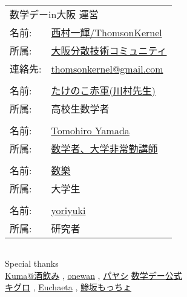 \documentclass[b5paper,fleqn]{ltjsarticle}
\begin{document}
\newpage
\thispagestyle{empty}
\vspace*{\fill}
\begin{flushright}
\begin{minipage}{0.5\hsize}
  \begin{tabular}{|ll}
  \multicolumn{2}{|l}{数学デーin大阪 運営}\\[10pt]
  名前: &\href{https://twitter.com/ThomsonKernel}{西村一輝/ThomsonKernel}\\
  所属: &\href{https://sites.google.com/view/osaka-dtc}{大阪分散技術コミュニティ}\\
  連絡先: & \href{mailto:thomsonkernel@gmail.com}{thomsonkernel@gmail.com}\\
  \\
  名前: &\href{https://twitter.com/691_7758337633}{たけのこ赤軍(川村先生)}\\
  所属: &高校生数学者\\
  \\
  名前: &\href{https://twitter.com/tyamada1093}{Tomohiro Yamada}\\
  所属: &\href{https://kansai-lisp-useres.connpass.com}{数学者、大学非常勤講師}\\
  \\
  名前: &\href{https://twitter.com/coc_mathfun}{数樂}\\
  所属: &大学生\\
  \\
  名前: &\href{https://twitter.com/yoriyuki}{yoriyuki}\\
  所属: &研究者\\
  \end{tabular}
  \begin{tabular}{l}
\end{tabular}\vskip15pt
Special thanks\\
   \href{https://twitter.com/notori48}{Kuma@酒飲み}
   , \href{https://twitter.com/ONEWAN}{onewan}
   , \href{https://twitter.com/Paya_payashi}{パヤシ}\vskip10pt
   \href{https://twitter.com/sugaku_day}{数学デー公式}\\
   \href{https://twitter.com/kiguro_masanao}{キグロ}
   , \href{https://twitter.com/euchaeta}{Euchaeta}
   , \href{https://twitter.com/motcho_tw}{鯵坂もっちょ}
\end{minipage}
\end{flushright}
\end{document}
